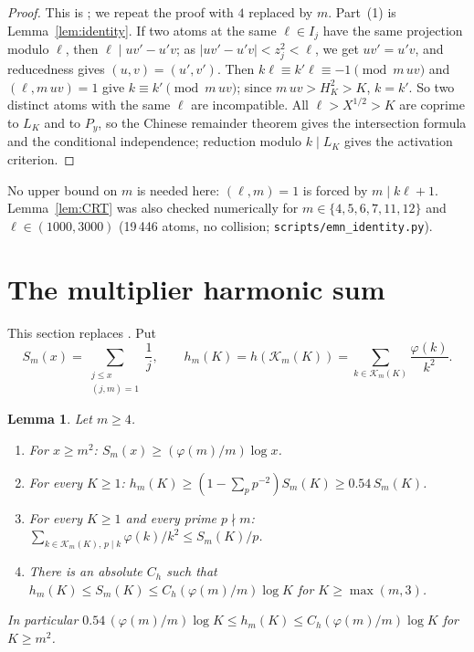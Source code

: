 \documentclass[10pt,reqno]{amsart}
\newtheorem{lemma}[theorem]{Lemma}
\theoremstyle{definition}
\newcommand{\K}{\mathcal K}
\begin{document}
\begin{proof}
This is \cite[Lemma~2.2]{TQ}; we repeat the proof with $4$ replaced by
$m$.  Part~(1) is Lemma~\ref{lem:identity}.  If two atoms at the same
$\ell\in I_j$ have the same projection modulo $\ell$, then
$\ell\mid uv'-u'v$; as $|uv'-u'v|<z_j^2<\ell$, we get $uv'=u'v$, and
reducedness gives $(u,v)=(u',v')$.  Then
$k\ell\equiv k'\ell\equiv-1\pmod{m\,uv}$ and $(\ell,m\,uv)=1$ give
$k\equiv k'\pmod{m\,uv}$; since $m\,uv>H_K^2>K$, $k=k'$.  So two distinct
atoms with the same $\ell$ are incompatible.  All $\ell>X^{1/2}>K$ are
coprime to $L_K$ and to $P_y$, so the Chinese remainder theorem gives the
intersection formula and the conditional independence; reduction modulo
$k\mid L_K$ gives the activation criterion.
\end{proof}

No upper bound on $m$ is needed here: $(\ell,m)=1$ is forced by
$m\mid k\ell+1$.  Lemma~\ref{lem:CRT} was also checked numerically for
$m\in\{4,5,6,7,11,12\}$ and $\ell\in(1000,3000)$ (19\,446 atoms, no
collision; \texttt{scripts/emn\_identity.py}).

\section{The multiplier harmonic sum}\label{sec:hm}
This section replaces \cite[Lemma~3.2]{TQ}.  Put
\[
 S_m(x)=\sum_{\substack{j\leq x\\(j,m)=1}}\frac1j,\qquad
 h_m(K)=h(\K_m(K))=\sum_{k\in\K_m(K)}\frac{\varphi(k)}{k^2}.
\]

\begin{lemma}\label{lem:hm}
Let $m\geq4$.
\begin{enumerate}
\item[(a)] For $x\geq m^2$: $S_m(x)\geq(\varphi(m)/m)\log x$.
\item[(b)] For every $K\geq1$: $h_m(K)\geq(1-\sum_pp^{-2})S_m(K)\geq0.54\,S_m(K)$.
\item[(c)] For every $K\geq1$ and every prime $p\nmid m$:
$\sum_{k\in\K_m(K),\,p\mid k}\varphi(k)/k^2\leq S_m(K)/p$.
\item[(d)] There is an absolute $C_h$ such that
$h_m(K)\leq S_m(K)\leq C_h(\varphi(m)/m)\log K$ for $K\geq\max(m,3)$.
\end{enumerate}
In particular $0.54\,(\varphi(m)/m)\log K\leq h_m(K)\leq
C_h(\varphi(m)/m)\log K$ for $K\geq m^2$.
\end{lemma}
\end{document}
